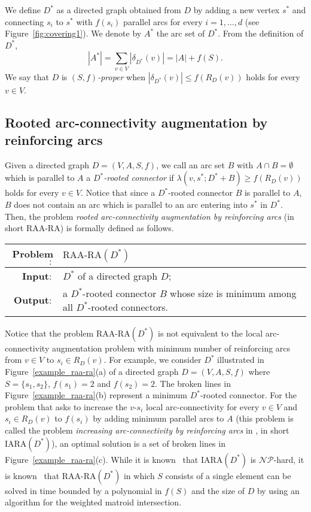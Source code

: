 \documentclass[11pt]{article}
\newcounter{ni}
\theoremstyle{plain}
\begin{document}
We define $D^{\ast}$ as a directed graph  obtained from $D$ by
adding a new vertex $s^{\ast}$ and connecting $s_i$ to $s^{\ast}$ with
$f(s_i)$ parallel arcs for every $i=1,\ldots,d$ (see Figure~\ref{fig:covering1}).
We denote by $A^{\ast}$ the arc set of $D^{\ast}$.  
From the definition of $D^{\ast}$, 
\begin{equation} \label{eq1:directed graphs}
|A^{\ast}|
=\mbox{$\sum$}_{v\in V}|\delta_{D^{\ast}}(v)|
= |A| + f(S).
\end{equation}
We say that $D$ is {\it $(S,f)$-proper} when 
$|\delta_{D^{\ast}}(v)| \le f(R_D(v))$ holds for every $v \in V$. 

\subsection{Rooted arc-connectivity augmentation by reinforcing arcs}

Given a directed graph  $D=(V,A,S,f)$, 
we call an arc set $B$ with $A\cap B=\emptyset$ which is parallel to $A$ 
a {\it $D^{\ast}$-rooted connector} 
if $\lambda(v,s^{\ast};D^{\ast}+B) \ge f(R_D(v))$ holds for every $v \in V$.
Notice that since a $D^{\ast}$-rooted connector $B$ is parallel to $A$, 
$B$ does not contain an arc which is parallel to an arc entering into $s^{\ast}$ in $D^{\ast}$. 
Then, the problem {\it rooted arc-connectivity augmentation by reinforcing arcs} 
(in short $\mbox{RAA-RA}$) is formally defined as follows.
\begin{center}
\begin{tabularx}{150mm}{rX}
\hline
{\bf Problem$\colon$} & $\mbox{RAA-RA}(D^{\ast})$ \\
\hline 
{\bf Input$\colon$} & $D^{\ast}$ of a directed graph $D$;\\
{\bf Output$\colon$} &
a $D^{\ast}$-rooted connector $B$ whose size is minimum among all 
$D^{\ast}$-rooted connectors. \\
\hline
\end{tabularx}
\end{center}

Notice that the problem $\mbox{RAA-RA}(D^{\ast})$ 
is not equivalent to the local arc-connectivity augmentation problem with 
minimum number of reinforcing arcs from $v \in V$ to $s_i \in R_D(v)$.
For example, we consider $D^{\ast}$ illustrated in Figure~\ref{example_raa-ra}(a) 
of a directed graph  $D=(V,A,S,f)$ 
where $S=\{s_1,s_2\}$, $f(s_1)=2$ and $f(s_2)=2$. The broken lines in Figure~\ref{example_raa-ra}(b)
represent a minimum $D^{\ast}$-rooted connector. For the problem that asks to increase the $v$-$s_i$ local 
arc-connectivity for every $v \in V$ and $s_i \in R_D(v)$ to $f(s_i)$ by adding minimum 
parallel arcs to $A$ (this problem is called the problem 
{\it increasing arc-connectivity by reinforcing arcs} in \cite{J97}, 
in short $\mbox{IARA}(D^{\ast})$), 
an optimal solution is a set of broken lines in Figure~\ref{example_raa-ra}(c). 
While it is known~\cite{J97} that $\mbox{IARA}(D^{\ast})$ 
is $\mathcal{NP}$-hard, 
it is known~\cite{F06} that 
$\mbox{RAA-RA}(D^{\ast})$ in which $S$ consists of a single element can be solved 
in time bounded by a polynomial in $f(S)$ and the size of $D$
by using an algorithm for the weighted matroid intersection.    
\end{document}
